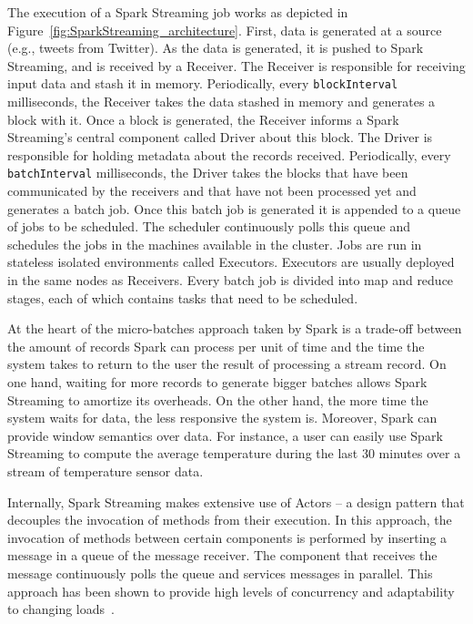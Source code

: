 The execution of a Spark Streaming job works as depicted in Figure~\ref{fig:SparkStreaming_architecture}. 
First, data is generated at a source (e.g., tweets from Twitter). As the data is generated, it is pushed to Spark Streaming, and is received by a Receiver. 
The Receiver is responsible for receiving input data and stash it in memory. Periodically, every \texttt{blockInterval} milliseconds, the Receiver takes the data stashed in memory and generates a block with it.
Once a block is generated, the Receiver informs a Spark Streaming's central component called Driver about this block. The Driver is responsible for holding metadata about the records received. 
Periodically, every \texttt{batchInterval} milliseconds, the Driver takes the blocks that have been communicated by the receivers and that have not been processed yet and generates a batch job. 
Once this batch job is generated it is appended to a queue of jobs to be scheduled. 
The scheduler continuously polls this queue and schedules the jobs in the machines available in the cluster.
Jobs are run in stateless isolated environments called Executors. Executors are usually deployed in the same nodes as Receivers.
Every batch job is divided into map and reduce stages, each of which contains tasks that need to be scheduled.

At the heart of the micro-batches approach taken by Spark is a trade-off between the amount of records Spark can process per unit of time and the time the system takes to return to the user the result of processing a stream record.
On one hand, waiting for more records to generate bigger batches allows Spark Streaming to amortize its overheads. On the other hand, the more time the system waits for data, the less responsive the system is.
Moreover, Spark can provide window semantics over data. For instance, a user can easily use Spark Streaming to compute the average temperature during the last 30 minutes over a stream of temperature sensor data.


Internally, Spark Streaming makes extensive use of Actors -- a design pattern that decouples the invocation of methods from their execution. 
In this approach, the invocation of methods between certain components is performed by inserting a message in a queue of the message receiver.
The component that receives the message continuously polls the queue and services messages in parallel.
This approach has been shown to provide high levels of concurrency and adaptability to changing loads~\cite{SEDA}.
